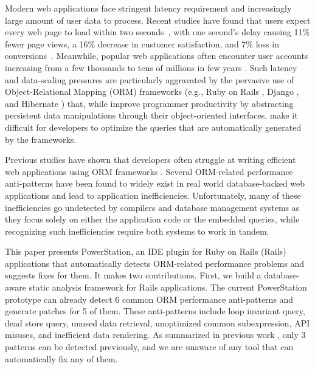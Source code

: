 \label{sec:introduction}

Modern web applications face stringent latency requirement and increasingly large amount of user data to process.
Recent studies have found that users expect every web page to load within two seconds~\cite{twosecond}, with one
second's delay causing 11\% fewer page views, a 16\% decrease in customer satisfaction, and 7\% loss in conversions~\cite{onesecond}. Meanwhile, popular web applications often encounter user accounts
increasing from a few thousands to tens of millions in few years \cite{AirbnbData}. 
Such latency
and data-scaling pressures are particularly aggravated 
by the pervasive use of Object-Relational Mapping
(ORM) frameworks (e.g., Ruby on Rails \cite{rails}, Django \cite{django}, and Hibernate \cite{hibernate}) that, while improve programmer productivity by abstracting persistent data manipulations 
through their object-oriented interfaces, make it difficult for developers to optimize the queries that are automatically generated by the frameworks.

Previous studies have shown that developers often struggle at writing efficient web applications
using ORM frameworks
\cite{yan:cikm17, junwen:icse2018, chen2016finding, cheung2013optimizing}. 
Several ORM-related performance anti-patterns have been found to widely exist 
in real world database-backed web applications and lead to application inefficiencies.
Unfortunately, many of these inefficiencies go undetected by compilers and database management systems as they focus solely on either the application code or the embedded queries, while recognizing such inefficiencies require both systems to work in tandem.

This paper presents PowerStation, an IDE plugin for Ruby on Rails (Rails) applications that automatically detects ORM-related
performance problems and suggests fixes for them.
It makes two contributions.
First, we build a database-aware static analysis framework for Rails applications. 
The current PowerStation prototype can already detect 6 common
ORM performance anti-patterns and generate patches for 5 of them. 
These anti-patterns include loop invariant query, dead store query, unused data retrieval, unoptimized common subexpression, API misuses, and inefficient data rendering.
As summarized in previous work \cite{yan:cikm17, junwen:icse2018, chen2016finding}, only 3 patterns
can be detected previously, and we are unaware of any tool that can automatically fix any of them. %

